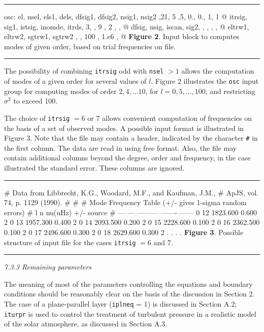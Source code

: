 \smallskip
\hrule
\medskip
{
\obeyspaces
\source
osc:
  el, nsel, els1, dels, dfsig1, dfsig2, nsig1, nsig2
    ,21,  5  ,5,   0.,    0.,   1,    1     @
  itrsig, sig1, istsig, inomde, itrds,
    3,       ,   9 ,    2 ,     ,       @
  dfsig, nsig, iscan, sig2,
      ,       ,    ,    ,    @
eltrw1, eltrw2, sgtrw1, sgtrw2
    ,        ,   100 ,   1.e6    ,    @
}
\msni
{\bf Figure 2}. Input block to computes modes of given order,
based on trial frequencies on file.
\medskip
\hrule
\smallskip
\gif

The possibility of combining {\tt itrsig} odd with {\tt nsel} $> 1$
allows the computation of modes of a given order for several values of $l$. 
Figure 2 illustrates the {\tt osc} input group for computing
modes of order $2, 4, \ldots 10$, for $l = 0, 5, \ldots , 100$,
and restricting $\sigma^2$ to exceed 100.

The choice of {\tt itrsig} $= 6$ or 7 allows convenient computation
of frequencies on the basis of a set of observed modes.
A possible input format is illustrated in Figure 3.
Note that the file may contain a header, indicated by
the character {\tt \#} in the first column.
The data are read in using free format.
Also, the file may contain additional columns beyond the
degree, order and frequency, in the case illustrated the standard error.
These columns are ignored.

\smallskip
\hrule
\medskip
{
\obeyspaces
\source
\# Data from Libbrecht, K.G., Woodard, M.F., and Kaufman, J.M.,
\# ApJS, vol. 74, p. 1129 (1990).
\#
\#
\# Mode Frequency Table (+/- gives 1-sigma random errors)
\#    l     n   nu(uHz)    +/-  source  
\#    ---   --- --------- ------- ------
     0    12  1823.600   0.600    2
     0    13  1957.300   0.400    2
     0    14  2093.500   0.200    2
     0    15  2228.600   0.100    2
     0    16  2362.500   0.100    2
     0    17  2496.600   0.300    2
     0    18  2629.600   0.300    2
                  .
                  .
                  .
                  .
}
\msni
{\bf Figure 3}. Possible structure of input file for the
cases {\tt itrsig} $= 6$ and 7.
\medskip
\hrule
\smallskip
\gif


\subsect
{\it 7.3.3 Remaining parameters} 

The meaning of most of the parameters controlling the equations and
boundary conditions should be reasonably clear on the basis of the
discussion in Section 2.
The case of a plane-parallel layer ({\tt iplneq} = 1)
is discussed in Section A.2; {\tt iturpr} is used to control 
the treatment of turbulent pressure in a realistic model of the solar
atmosphere, as discussed in Section A.3.

